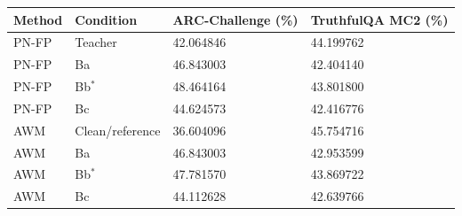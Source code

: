 \begin{tabular}{llll}
\toprule
Method & Condition & ARC-Challenge (\%) & TruthfulQA MC2 (\%) \\
\midrule
PN-FP & Teacher & 42.064846 & 44.199762 \\
PN-FP & Ba & 46.843003 & 42.404140 \\
PN-FP & Bb$^\ast$ & 48.464164 & 43.801800 \\
PN-FP & Bc & 44.624573 & 42.416776 \\
AWM & Clean/reference & 36.604096 & 45.754716 \\
AWM & Ba & 46.843003 & 42.953599 \\
AWM & Bb$^\ast$ & 47.781570 & 43.869722 \\
AWM & Bc & 44.112628 & 42.639766 \\
\bottomrule
\end{tabular}
